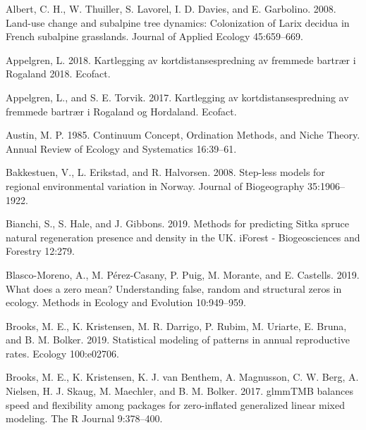 \documentclass[
]{article}
\begin{document}
\hypertarget{refs}{}
\leavevmode\hypertarget{ref-albertLanduseChangeSubalpine2008}{}%
Albert, C. H., W. Thuiller, S. Lavorel, I. D. Davies, and E. Garbolino. 2008. Land-use change and subalpine tree dynamics: Colonization of Larix decidua in French subalpine grasslands. Journal of Applied Ecology 45:659--669.

\leavevmode\hypertarget{ref-appelgrenKartleggingAvKortdistansespredning2018}{}%
Appelgren, L. 2018. Kartlegging av kortdistansespredning av fremmede bartrær i Rogaland 2018. Ecofact.

\leavevmode\hypertarget{ref-appelgrenKartleggingAvKortdistansespredning2017}{}%
Appelgren, L., and S. E. Torvik. 2017. Kartlegging av kortdistansespredning av fremmede bartrær i Rogaland og Hordaland. Ecofact.

\leavevmode\hypertarget{ref-austinContinuumConceptOrdination1985}{}%
Austin, M. P. 1985. Continuum Concept, Ordination Methods, and Niche Theory. Annual Review of Ecology and Systematics 16:39--61.

\leavevmode\hypertarget{ref-bakkestuenSteplessModelsRegional2008}{}%
Bakkestuen, V., L. Erikstad, and R. Halvorsen. 2008. Step-less models for regional environmental variation in Norway. Journal of Biogeography 35:1906--1922.

\leavevmode\hypertarget{ref-bianchiMethodsPredictingSitka2019}{}%
Bianchi, S., S. Hale, and J. Gibbons. 2019. Methods for predicting Sitka spruce natural regeneration presence and density in the UK. iForest - Biogeosciences and Forestry 12:279.

\leavevmode\hypertarget{ref-blasco-morenoWhatDoesZero2019}{}%
Blasco-Moreno, A., M. Pérez-Casany, P. Puig, M. Morante, and E. Castells. 2019. What does a zero mean? Understanding false, random and structural zeros in ecology. Methods in Ecology and Evolution 10:949--959.

\leavevmode\hypertarget{ref-brooksStatisticalModelingPatterns2019}{}%
Brooks, M. E., K. Kristensen, M. R. Darrigo, P. Rubim, M. Uriarte, E. Bruna, and B. M. Bolker. 2019. Statistical modeling of patterns in annual reproductive rates. Ecology 100:e02706.

\leavevmode\hypertarget{ref-brooksGlmmTMBBalancesSpeed2017}{}%
Brooks, M. E., K. Kristensen, K. J. van Benthem, A. Magnusson, C. W. Berg, A. Nielsen, H. J. Skaug, M. Maechler, and B. M. Bolker. 2017. glmmTMB balances speed and flexibility among packages for zero-inflated generalized linear mixed modeling. The R Journal 9:378--400.
\end{document}
